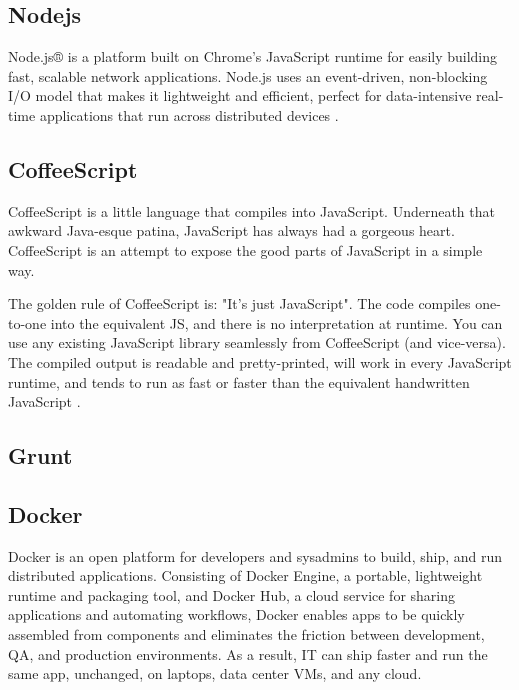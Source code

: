 	\subsection{Nodejs} Node.js® is a platform built on Chrome's JavaScript runtime for easily building fast, scalable network applications. Node.js uses an event-driven, non-blocking I/O model that makes it lightweight and efficient, perfect for data-intensive real-time applications that run across distributed devices \cite{technology_nodejs}.
	
	\subsection{CoffeeScript}
	CoffeeScript is a little language that compiles into JavaScript. Underneath that awkward Java-esque patina, JavaScript has always had a gorgeous heart. CoffeeScript is an attempt to expose the good parts of JavaScript in a simple way.
	
	The golden rule of CoffeeScript is: "It's just JavaScript". The code compiles one-to-one into the equivalent JS, and there is no interpretation at runtime. You can use any existing JavaScript library seamlessly from CoffeeScript (and vice-versa). The compiled output is readable and pretty-printed, will work in every JavaScript runtime, and tends to run as fast or faster than the equivalent handwritten JavaScript \cite{technology_coffeescript}.
	
	\subsection{Grunt} 
	\cite{technology_gruntjs}
	
	\subsection{Docker}
	Docker is an open platform for developers and sysadmins to build, ship, and run distributed applications. Consisting of Docker Engine, a portable, lightweight runtime and packaging tool, and Docker Hub, a cloud service for sharing applications and automating workflows, Docker enables apps to be quickly assembled from components and eliminates the friction between development, QA, and production environments. As a result, IT can ship faster and run the same app, unchanged, on laptops, data center VMs, and any cloud\cite{technology_docker}.
	
	




